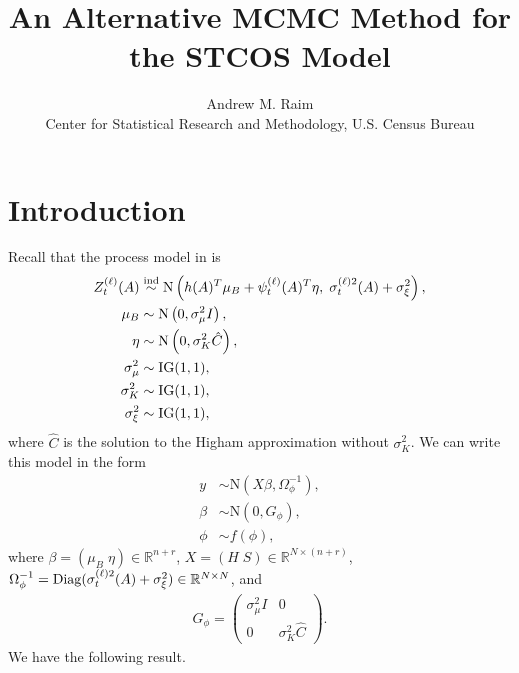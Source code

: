 \documentclass[10pt]{article}
\title{An Alternative MCMC Method for the STCOS Model}
\author{Andrew M. Raim
\vspace{0.5em} \\
Center for Statistical Research and Methodology, U.S. Census Bureau
}
\begin{document}
\maketitle

\section{Introduction}
\label{sec:intro}
Recall that the process model in \citet{BradleyEtAl2016-STAT} is
%
\begin{align*}
Z_t^{(\ell)}(A) &\stackrel{\text{ind}}{\sim} \text{N}\left(
h(A)^T \mu_B + \psi_t^{(\ell)}(A)^T \eta, \;
\sigma_t^{(\ell)2}(A) + \sigma_\xi^2
\right), \\
\mu_B &\sim \text{N}\left(0, \sigma_\mu^2 I \right), \\
\eta &\sim \text{N}\left(0, \sigma_K^2 \hat{C} \right), \\
\sigma_\mu^2 &\sim \text{IG}(1, 1), \\
\sigma_K^2 &\sim \text{IG}(1, 1), \\
\sigma_\xi^2 &\sim \text{IG}(1, 1),
\end{align*}
%
where $\hat{C}$ is the solution to the Higham approximation without $\sigma_K^2$. We can write this model in the form
%
\begin{align}
y &\sim \text{N}(X \beta, \Omega_\phi^{-1}), \nonumber \\
\beta &\sim \text{N}(0, G_\phi), \nonumber \\
\phi &\sim f(\phi),
\label{eqn:regression}
\end{align}
%
where $\beta = (\mu_B \; \eta) \in \mathbb{R}^{n + r}$, $X = (H \; S) \in \mathbb{R}^{N \times (n + r)}$, $\Omega_\phi^{-1} = \operatorname{Diag}(\sigma_t^{(\ell)2}(A) + \sigma_\xi^2) \in \mathbb{R}^{N \times N}$, and
%
\begin{align*}
G_\phi =
\begin{pmatrix}
\sigma_\mu^2 I & 0 \\
0 & \sigma_K^2 \hat{C}
\end{pmatrix}.
\end{align*}
%
We have the following result.
\end{document}
